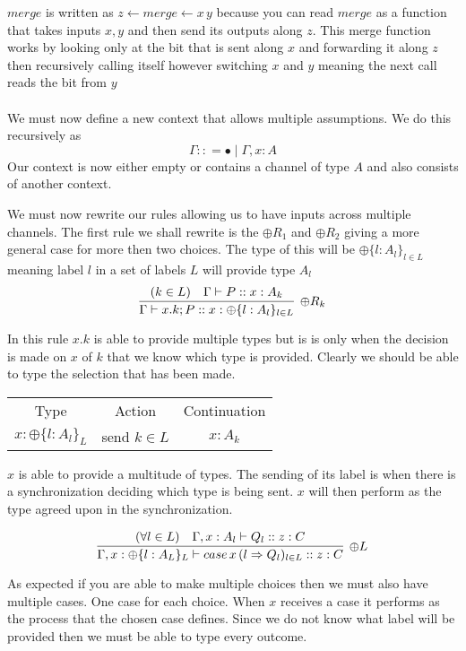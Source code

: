 \documentclass{article}
\begin{document}
\(merge\) is written as \(z \leftarrow merge \leftarrow x \, y \) because you can read \(merge\) as a function that takes inputs \(x, y\) and then send its outputs along \(z\). This merge function works by looking only at the bit that is sent along \(x\) and forwarding it along \(z\) then recursively calling itself however switching \(x\) and \(y\) meaning the next call reads the bit from \(y\)
\\
\\
We must now define a new context that allows multiple assumptions. We do this recursively as 
\[ \Gamma :: = 	\bullet \mid \Gamma , x:A \]
Our context is now either empty or contains a channel of type \(A\) and also consists of another context.


We must now rewrite our rules allowing us to have inputs across multiple channels. The first rule we shall rewrite is the \(\oplus R_1 \) and \(\oplus R _2\) giving a more general case for more then two choices. The type of this will be \(\oplus \{ l:A_l \}_{l \in L}\) meaning label \(l\) in a set of labels \(L\) will provide type \(A_l\)
\[
\infer[{\oplus R_k}]
    {\Gamma \vdash x.k;P :: x : \oplus \{ l : A_l \} _{l \in L}}
    {(k \in L) & \Gamma \vdash P :: x:A_k }
\]

In this rule \(x.k\) is able to provide multiple types but is is only when the decision is made on \(x\) of \(k\) that we know which type is provided. Clearly we should be able to type the selection that has been made.


\begin{center}
    \begin{tabular}{ c c c }
     Type & Action & Continuation \\ 
     \(x:\oplus \{ l: A_{l} \}_{L}\) & send \(k \in L\) & \(x:A_k\)   
    \end{tabular}
\end{center}

\(x\) is able to provide a multitude of types. The sending of its label is when there is a synchronization deciding which type is being sent. \(x\) will then perform as the type agreed upon in the synchronization.


\[
\infer[{\oplus L}]
    {\Gamma, x: \oplus \{ l : A_L\}_L \vdash case \, x \, (l \Rightarrow Q_l)_{l \in L} :: z : C }
    {(\forall l \in L) & \Gamma, x:A_l \vdash Q_l :: z:C }
\]

As expected if you are able to make multiple choices then we must also have multiple cases. One case for each choice. When \(x\) receives a case it performs as the process that the chosen case defines. Since we do not know what label will be provided then we must be able to type every outcome.
\end{document}
